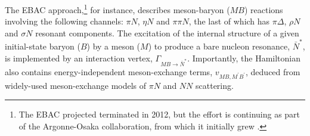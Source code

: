 
The EBAC approach,\footnote{The EBAC projected terminated in 2012, but the effort is continuing as part of the  Argonne-Osaka collaboration, from which it initially grew \cite{Sato:1996gk, Matsuyama:2006rp}.} for instance, describes meson-baryon ($MB$) reactions involving the following channels: $\pi N$, $\eta N$ and $\pi\pi N$, the last of which has $\pi \Delta$, $\rho N$ and $\sigma N$ resonant components.  The excitation of the internal structure of a given initial-state baryon ($B$) by a meson ($M$) to produce a bare nucleon resonance, $\bar N^\ast$, is implemented by an interaction vertex, $\Gamma_{MB\to \bar N^\ast}$.  Importantly, the Hamiltonian also contains energy-independent meson-exchange terms, $v_{MB,M^\prime B^\prime}$, deduced from widely-used meson-exchange models of $\pi N$ and $NN$ scattering.

